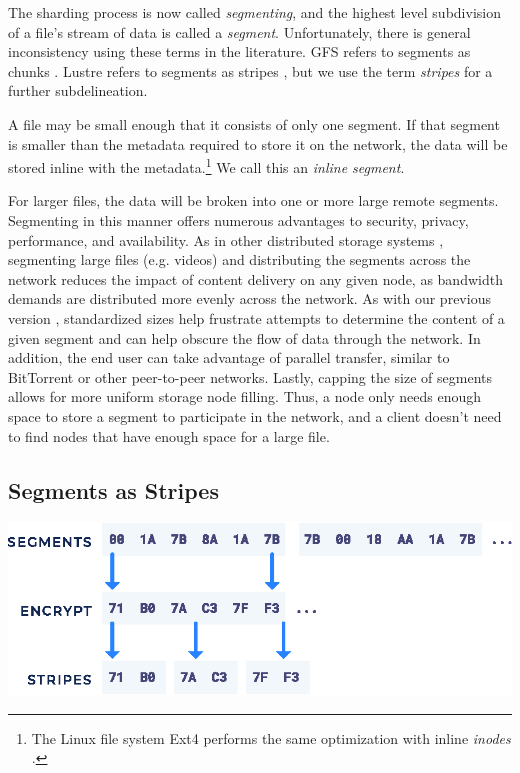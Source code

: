 \documentclass[8pt,fleqn,openany]{book}
\begin{document}
The sharding process is now called {\em segmenting}, and the highest level
subdivision of a file's stream of data is called a {\em segment}.
Unfortunately, there is general inconsistency using these terms in the
literature. GFS refers to segments as chunks \cite{gfs}.
Lustre refers to segments as stripes \cite{lustre}, but we use the term
{\em stripes} for a further subdelineation.

A file may be small enough that it consists of only one segment.
If that segment is smaller than the metadata required to store it on the
network, the data will be stored inline with the metadata.\footnote{
The Linux file system Ext4 performs the same optimization
with inline {\em inodes} \cite{ext4-inline}.}
We call this an {\em inline segment}.

For larger files, the data will be broken
into one or more large remote segments. Segmenting in this manner offers
numerous advantages to security, privacy, performance, and availability.
As in other distributed storage systems \cite{gfs, hdfs, qfs, hopsfs, lustre},
segmenting large files (e.g. videos) and
distributing the segments
across the network reduces the impact of content delivery on any
given node, as
bandwidth demands are distributed more evenly across the network.
As with our previous version \cite{storj-v2},
standardized sizes help frustrate attempts to determine the content of a given
segment and can help obscure the flow of data through the network.
In addition, the end user can take advantage of parallel transfer, similar to
BitTorrent \cite{bittorrent} or other peer-to-peer networks.
Lastly, capping the size of segments
allows for more uniform storage node filling. Thus, a node only needs enough
space to store a segment to participate in the network,
and a client doesn't need
to find nodes that have enough space for a large file.

\subsection{Segments as Stripes}\label{segments-as-stripes}

\begin{center}
\includegraphics[width=.65\textwidth]{images/segment-stripe.eps}
\end{center}
\end{document}
